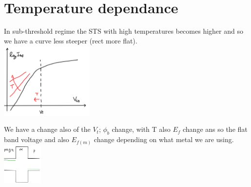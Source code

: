 \section{Temperature dependance}
In sub-threshold regime the STS with high temperatures becomes higher and so we have a curve less steeper (rect more flat).\\


\centering
\includegraphics[width=0.35\textwidth]{tchange.png}\\
\raggedright

We have a change also of the $V_t$; $\phi_b$ change, with T also $E_f$ change ans so the flat band voltage and also $E_{f(m)}$ change depending on what metal we are using.\\


\centering
\includegraphics[width=0.15\textwidth]{1tchange.png}\\
\raggedright



